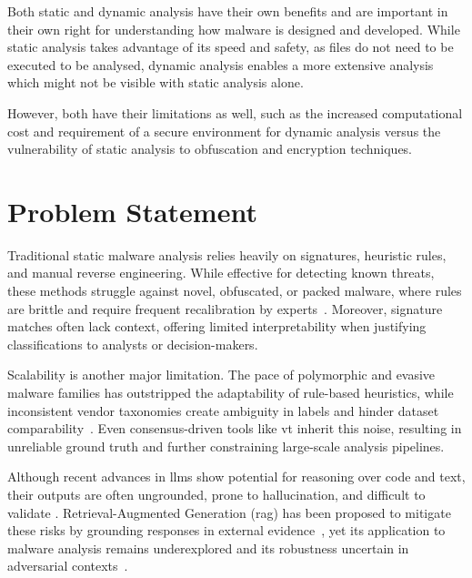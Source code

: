 Both static and dynamic analysis have their own benefits and are important in their own right for
understanding how malware is designed and developed. While static analysis takes advantage of its
speed and safety, as files do not need to be executed to be analysed, dynamic analysis enables a
more extensive analysis which might not be visible with static analysis alone.

However, both have their limitations as well, such as the increased computational cost and
requirement of a secure environment for dynamic analysis versus the vulnerability of static
analysis to obfuscation and encryption techniques.

\section{Problem Statement}\label{sec:ProblemStatement}
Traditional static malware analysis relies heavily on signatures, heuristic rules, and manual
reverse engineering. While effective for detecting known threats, these methods struggle against
novel, obfuscated, or packed malware, where rules are brittle and require frequent recalibration by
experts~\cite{fedak2020fundamentals, patil2014computer}. Moreover, signature matches often lack
context, offering limited interpretability when justifying classifications to analysts or
decision-makers.

Scalability is another major limitation. The pace of polymorphic and evasive malware families has
outstripped the adaptability of rule-based heuristics, while inconsistent vendor taxonomies create
ambiguity in labels and hinder dataset comparability~\cite{gaber2024malware, wong2021practice}.
Even consensus-driven tools like \gls{vt} inherit this noise, resulting in unreliable ground truth
and further constraining large-scale analysis pipelines.

Although recent advances in \glspl{llm} show potential for reasoning over code and text, their
outputs are often ungrounded, prone to hallucination, and difficult to validate \cite{fujii2024llm,
	nourmohammadzadeh2024llmsurvey, ferrag2024allinsights}. Retrieval-Augmented Generation (\gls{rag})
has been proposed to mitigate these risks by grounding responses in external
evidence~\cite{gao2023retrieval, lewis2020retrieval}, yet its application to malware analysis
remains underexplored and its robustness uncertain in adversarial
contexts~\cite{zou2024poisonedrag}.

